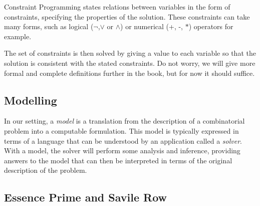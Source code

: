 Constraint Programming states relations between variables in the form of
constraints, specifying the properties of the solution. These constraints can
take many forms, such as logical ($\neg$,$\vee$ or $\wedge$) or numerical (+,
-, $*$) operators for example.

The set of constraints is then solved by giving a value to each variable so
that the solution is consistent with the stated constraints.  Do not worry, we
will give more formal and complete definitions further in the book, but for now
it should suffice.

\subsection{Modelling}

In our setting, a \emph{model} is a translation from the description of a
combinatorial problem into a computable formulation. This model is typically
expressed in terms of a language that can be understood by an application
called a \emph{solver}. With a model, the solver will perform some analysis and
inference, providing answers to the model that can then be interpreted
in terms of the original description of the problem. 


\subsection{Essence Prime and Savile Row}
